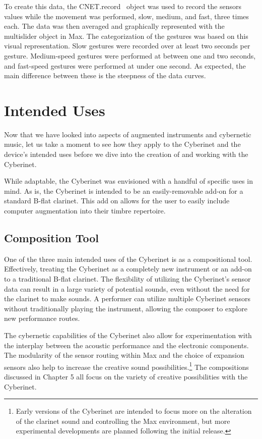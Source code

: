 To create this data, the CNET.record~ object was used to record the sensors values while the movement was performed, slow, medium, and fast, three times each. The data was then averaged and graphically represented with the multislider object in Max. The categorization of the gestures was based on this visual representation. Slow gestures were recorded over at least two seconds per gesture. Medium-speed gestures were performed at between one and two seconds, and fast-speed gestures were performed at under one second. As expected, the main difference between these is the steepness of the data curves.



\chapter{Intended Uses}
Now that we have looked into aspects of augmented instruments and cybernetic music, let us take a moment to see how they apply to the Cyberinet and the device's intended uses before we dive into the creation of and working with the Cyberinet.

While adaptable, the Cyberinet was envisioned with a handful of specific uses in mind. As is, the Cyberinet is intended to be an easily-removable add-on for a standard B-flat clarinet. This add on allows for the user to easily include computer augmentation into their timbre repertoire. 

\section{Composition Tool}
One of the three main intended uses of the Cyberinet is as a compositional tool. Effectively, treating the Cyberinet as a completely new instrument or an add-on to a traditional B-flat clarinet. The flexibility of utilizing the Cyberinet's sensor data can result in a large variety of potential sounds, even without the need for the clarinet to make sounds. A performer can utilize multiple Cyberinet sensors without traditionally playing the instrument, allowing the composer to explore new performance routes.

The cybernetic capabilities of the Cyberinet also allow for experimentation with the interplay between the acoustic performance and the electronic components. The modularity of the sensor routing within Max and the choice of expansion sensors also help to increase the creative sound possibilities.\footnote{Early versions of the Cyberinet are intended to focus more on the alteration of the clarinet sound and controlling the Max environment, but more experimental developments are planned following the initial release.} The compositions discussed in Chapter 5 all focus on the variety of creative possibilities with the Cyberinet. 

